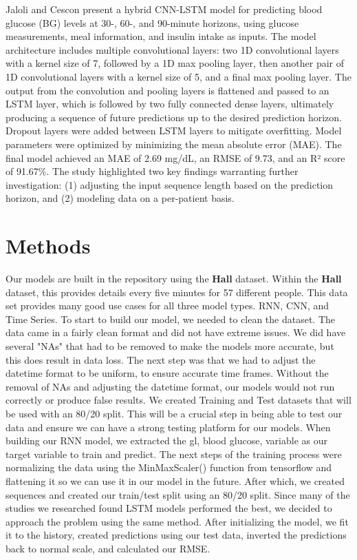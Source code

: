 \documentclass{article}
\begin{document}
Jaloli and Cescon \cite{LongTermCNN} present a hybrid CNN-LSTM model for predicting blood glucose (BG) levels at 30-, 60-, and 90-minute horizons, using glucose measurements, meal information, and insulin intake as inputs. The model architecture includes multiple convolutional layers: two 1D convolutional layers with a kernel size of 7, followed by a 1D max pooling layer, then another pair of 1D convolutional layers with a kernel size of 5, and a final max pooling layer. The output from the convolution and pooling layers is flattened and passed to an LSTM layer, which is followed by two fully connected dense layers, ultimately producing a sequence of future predictions up to the desired prediction horizon. Dropout layers were added between LSTM layers to mitigate overfitting. Model parameters were optimized by minimizing the mean absolute error (MAE). The final model achieved an MAE of 2.69 mg/dL, an RMSE of 9.73, and an R² score of 91.67\%. The study highlighted two key findings warranting further investigation: (1) adjusting the input sequence length based on the prediction horizon, and (2) modeling data on a per-patient basis.

\section*{Methods}

Our models are built in the \cite{GlucoBench} repository using the \textbf{Hall} dataset. Within the \textbf{Hall} dataset, this provides details every five minutes for 57 different people. This data set provides many good use cases for all three model types. RNN, CNN, and Time Series. To start to build our model, we needed to clean the dataset. The data came in a fairly clean format and did not have extreme issues. We did have several "NAs" that had to be removed to make the models more accurate, but this does result in data loss. The next step was that we had to adjust the datetime format to be uniform, to ensure accurate time frames. Without the removal of NAs and adjusting the datetime format, our models would not run correctly or produce false results. We created Training and Test datasets that will be used with an 80/20 split. This will be a crucial step in being able to test our data and ensure we can have a strong testing platform for our models. 
When building our RNN model, we extracted the gl, blood glucose, variable as our target variable to train and predict. The next steps of the training process were normalizing the data using the MinMaxScaler() function from tensorflow and flattening it so we can use it in our model in the future. After which, we created sequences and created our train/test split using an 80/20 split. Since many of the studies we researched found LSTM models performed the best, we decided to approach the problem using the same method. After initializing the model, we fit it to the history, created predictions using our test data, inverted the predictions back to normal scale, and calculated our RMSE. 
\end{document}
